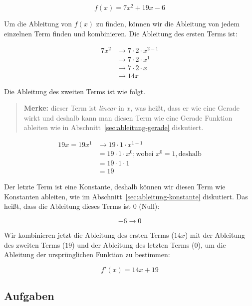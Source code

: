 \documentclass{scrartcl}
\begin{document}
\begin{equation}
    f(x) = 7 x^2 + 19 x - 6
\end{equation}

Um die Ableitung von $f(x)$ zu finden, können wir die Ableitung von jedem
einzelnen Term finden und kombinieren.  Die Ableitung des ersten Terms ist:

\begin{align}
    7 x^2 &\rightarrow 7 \cdot 2 \cdot x^{2 - 1}\\
    &\rightarrow 7 \cdot 2 \cdot x^1\\
    &\rightarrow 7 \cdot 2 \cdot x\\
    &\rightarrow 14 x
\end{align}

Die Ableitung des zweiten Terms ist wie folgt.

\begin{quotation}
\textbf{Merke:} dieser Term ist \emph{linear} in $x$, was heißt, dass er wie
eine Gerade wirkt und deshalb kann man diesen Term wie eine Gerade Funktion
ableiten wie in Abschnitt~\ref{sec:ableitung-gerade} diskutiert.
\end{quotation}

\begin{align}
    19 x = 19 x^1 &\rightarrow 19 \cdot 1 \cdot x^{1 - 1}\\
    &= 19 \cdot 1 \cdot x^0; \text{wobei } x^0 = 1, \text{deshalb}\\
    &= 19 \cdot 1 \cdot 1\\
    &= 19
\end{align}

Der letzte Term ist eine Konstante, deshalb können wir diesen Term wie
Konstanten ableiten, wie im Abschnitt~\ref{sec:ableitung-konstante}
diskutiert.  Das heißt, dass die Ableitung dieses Terms ist 0 (Null):

\begin{equation}
    -6 \rightarrow 0
\end{equation}

Wir kombinieren jetzt die Ableitung des ersten Terms ($14x$) mit der
Ableitung des zweiten Terms ($19$) und der Ableitung des letzten Terms
($0$), um die Ableitung der ursprünglichen Funktion zu bestimmen:

\begin{equation}
    f'(x) = 14 x + 19
\end{equation}

\subsection{Aufgaben}
\label{ex:quadratics}
\end{document}
